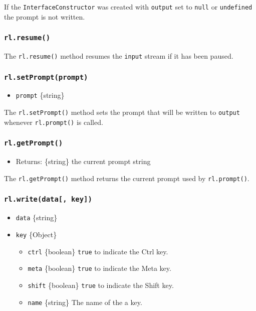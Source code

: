 If the \texttt{InterfaceConstructor} was created with \texttt{output}
set to \texttt{null} or \texttt{undefined} the prompt is not written.

\subsubsection{\texorpdfstring{\texttt{rl.resume()}}{rl.resume()}}\label{rl.resume}

The \texttt{rl.resume()} method resumes the \texttt{input} stream if it
has been paused.

\subsubsection{\texorpdfstring{\texttt{rl.setPrompt(prompt)}}{rl.setPrompt(prompt)}}\label{rl.setpromptprompt}

\begin{itemize}
\tightlist
\item
  \texttt{prompt} \{string\}
\end{itemize}

The \texttt{rl.setPrompt()} method sets the prompt that will be written
to \texttt{output} whenever \texttt{rl.prompt()} is called.

\subsubsection{\texorpdfstring{\texttt{rl.getPrompt()}}{rl.getPrompt()}}\label{rl.getprompt}

\begin{itemize}
\tightlist
\item
  Returns: \{string\} the current prompt string
\end{itemize}

The \texttt{rl.getPrompt()} method returns the current prompt used by
\texttt{rl.prompt()}.

\subsubsection{\texorpdfstring{\texttt{rl.write(data{[},\ key{]})}}{rl.write(data{[}, key{]})}}\label{rl.writedata-key}

\begin{itemize}
\tightlist
\item
  \texttt{data} \{string\}
\item
  \texttt{key} \{Object\}

  \begin{itemize}
  \tightlist
  \item
    \texttt{ctrl} \{boolean\} \texttt{true} to indicate the Ctrl key.
  \item
    \texttt{meta} \{boolean\} \texttt{true} to indicate the Meta key.
  \item
    \texttt{shift} \{boolean\} \texttt{true} to indicate the Shift key.
  \item
    \texttt{name} \{string\} The name of the a key.
  \end{itemize}
\end{itemize}

